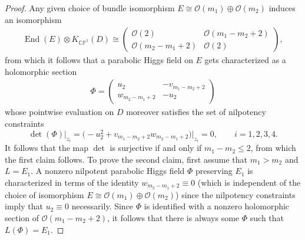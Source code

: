 \documentclass[10pt,a4paper]{amsart}
\newcommand{\field}[1]{\ensuremath{\mathbb{#1}}}
\newcommand{\CC}{\field{C}}
\newcommand{\PP}{\field{P}}
\newcommand{\calO}{\mathcal{O}}
\DeclareMathOperator{\End}{End}
\numberwithin{equation}{section}
\begin{document}
\begin{proof}
Any given choice of bundle isomorphism $E\cong \calO(m_{1})\oplus\calO(m_{2})$ induces an isomorphism
\begin{gather*}
\End(E)\otimes K_{\CC\PP^{1}}(D)\cong
\begin{pmatrix}
\calO(2) & \calO(m_{1}-m_{2}+2)\\
\calO(m_{2}-m_{1}+2) & \calO(2)
\end{pmatrix}\!,
\end{gather*}
from which it follows that a parabolic Higgs field on $E$ gets characterized as a holomorphic section
\begin{gather}\label{eq:Phi-1}
\Phi =
\begin{pmatrix}
u_{2} & -v_{m_{1}-m_{2}+2}\\
w_{m_{2}-m_{1}+2} & -u_{2}
\end{pmatrix}
\end{gather}
whose pointwise evaluation on $D$ moreover satisfies the set of nilpotency constraints
\[
\det(\Phi)\vert_{z_{i}} = \bigl({-}u_{2}^{2} + v_{m_{1}-m_{2}+2}w_{m_{2}-m_{1}+2}\bigr)\big\vert_{z_{i}}=0,\qquad i=1,2,3,4.
\]
It follows that the map $\det$ is surjective if and only if $m_{1}-m_{2}\leq 2$, from which the first claim follows. To prove the second claim, first assume that $m_{1} > m_{2}$ and $L=E_{1}$. A nonzero nilpotent parabolic Higgs field $\Phi$ preserving $E_{1}$ is characterized in terms of the identity $w_{m_{2}-m_{1}+2}\equiv 0$ (which is independent of the choice of isomorphism $E \cong \calO(m_{1})\oplus\calO(m_{2})$) since the nilpotency constraints imply that $u_{2}\equiv 0$ necessarily. Since $\Phi$ is identified with a nonzero holomorphic section of $\calO(m_{1}-m_{2}+2)$, it follows that there is always some $\Phi$ such that $L(\Phi)=E_{1}$.


\end{proof}
\end{document}
